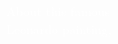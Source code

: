 \documentclass[preview,convert={density=600,outext=.png,command=\unexpanded{ {\convertexe\space -density \density\space\infile\space \ifx\size\empty\else -resize \size\fi\space -quality 90 -trim +repage -background "rgba(50,50,50,0.5)" -bordercolor "rgba(50,50,50,0.5)" -border 25 -flatten \outfile} } }]{standalone}
\begin{document}
\begin{center}
\textcolor{white}{ 
About this famous \\
Leonardo painting, \\ }
\end{center}
\end{document}
